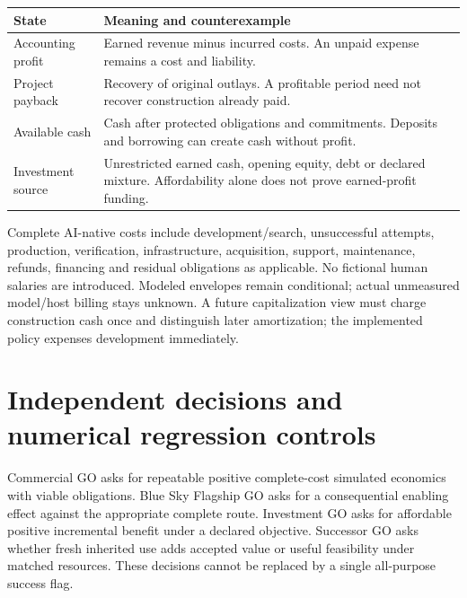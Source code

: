 \documentclass[10pt,a4paper]{article}
\begin{document}
\begin{center}
\begin{tabular}{p{.23\linewidth}p{.68\linewidth}}
\toprule
State & Meaning and counterexample\\
\midrule
Accounting profit & Earned revenue minus incurred costs. An unpaid expense remains a cost and liability.\\
Project payback & Recovery of original outlays. A profitable period need not recover construction already paid.\\
Available cash & Cash after protected obligations and commitments. Deposits and borrowing can create cash without profit.\\
Investment source & Unrestricted earned cash, opening equity, debt or declared mixture. Affordability alone does not prove earned-profit funding.\\
\bottomrule
\end{tabular}
\end{center}

Complete AI-native costs include development/search, unsuccessful attempts, production, verification, infrastructure, acquisition, support, maintenance, refunds, financing and residual obligations as applicable. No fictional human salaries are introduced. Modeled envelopes remain conditional; actual unmeasured model/host billing stays unknown. A future capitalization view must charge construction cash once and distinguish later amortization; the implemented policy expenses development immediately.
\newpage

\section{Independent decisions and numerical regression controls}
Commercial GO asks for repeatable positive complete-cost simulated economics with viable obligations. Blue Sky Flagship GO asks for a consequential enabling effect against the appropriate complete route. Investment GO asks for affordable positive incremental benefit under a declared objective. Successor GO asks whether fresh inherited use adds accepted value or useful feasibility under matched resources. These decisions cannot be replaced by a single all-purpose success flag.
\end{document}
